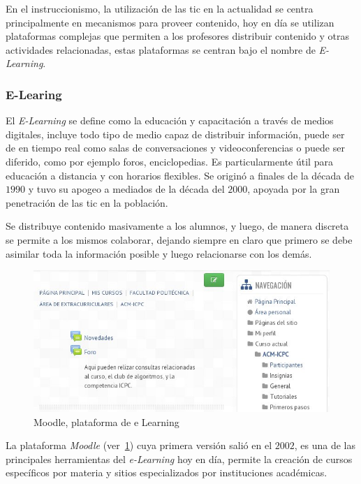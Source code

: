 En el instruccionismo, la utilización de las \Gls{tic} en la actualidad se
centra principalmente en mecanismos para proveer contenido, hoy en día se
utilizan plataformas complejas que permiten a los profesores distribuir
contenido y otras actividades relacionadas, estas plataformas se centran bajo
el nombre de \emph{E-Learning}.


\subsubsection{E-Learing} 

El \emph{E-Learning} se define como la educación y capacitación a través de
medios digitales, incluye todo tipo de medio capaz de distribuir información,
puede ser de en tiempo real como salas de conversaciones y videoconferencias o
puede ser diferido, como por ejemplo foros, enciclopedias. Es particularmente
útil para educación a distancia y con horarios flexibles. Se originó a finales
de la década de $1990$ y tuvo su apogeo a mediados de la década del $2000$,
apoyada por la gran penetración de las \Gls{tic} en la
población\cite{punie:ict}.

Se distribuye contenido masivamente a los alumnos, y luego, de manera discreta
se permite a los mismos colaborar, dejando siempre en claro que primero se debe
asimilar toda la información posible y luego relacionarse con los
demás\cite{leinonen:ict}.


\begin{figure}[h] 
\centering 
\includegraphics[scale=0.5]{tics/images/moodle.jpg}
\caption{Moodle, plataforma de e Learning} 
\label{fig:moodle}
\end{figure}


La plataforma \emph{Moodle} (ver~\ref{fig:moodle}) cuya primera versión salió en
el $2002$, es una de las principales herramientas del \emph{e-Learning} hoy en
día, permite la creación de cursos específicos por materia y sitios
especializados por instituciones académicas\cite{perkins2006using}. 

